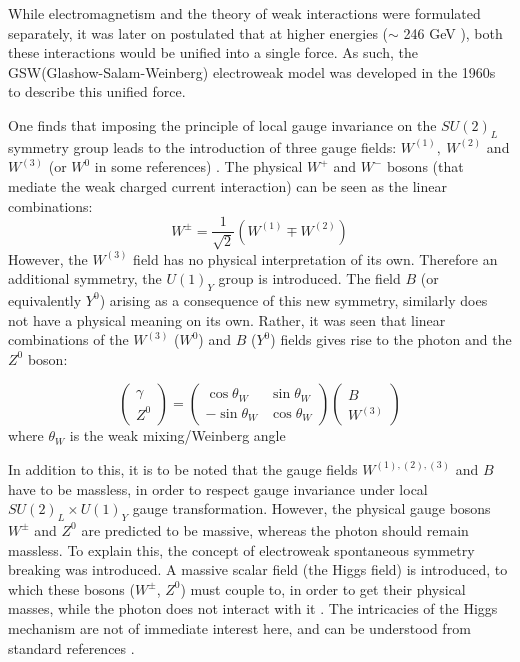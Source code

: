 While electromagnetism and the theory of weak interactions were formulated separately, it was later on postulated that at higher energies ($\sim$ 246 GeV \cite{enwiki:1085396801}), both these interactions would be unified into a single force. As such, the GSW(Glashow-Salam-Weinberg) electroweak model was developed in the 1960s to describe this unified force. 

One finds that imposing the principle of local gauge invariance on the $SU(2)_{L}$ symmetry group leads to the introduction of three gauge fields: $W^{(1)},\ W^{(2)}$ and $W^{(3)}$ (or $W^{0}$ in some references) \cite{thomson_2013}. The physical $W^{+}$ and $W^{-}$ bosons (that mediate the weak charged current interaction) can be seen as the linear combinations: 
\begin{equation}
W^{\pm}=\dfrac{1}{\sqrt{2}}\left(W^{(1)}\mp W^{(2)}\right)
\end{equation}
However, the $W^{(3)}$ field has no physical interpretation of its own. Therefore an additional symmetry, the $U(1)_{Y}$ group is introduced. The field $B$ (or equivalently $Y^{0}$) arising as a consequence of this new symmetry, similarly does not have a physical meaning on its own. Rather, it was seen that linear combinations of the $W^{(3)}$ ($W^{0}$) and $B$ ($Y^{0}$) fields gives rise to the  photon and the $Z^{0}$ boson:

\begin{equation}
\begin{pmatrix} 
\gamma \\ 
Z^{0} 
\end{pmatrix}
= 
\begin{pmatrix}
\cos \theta_{W} & \sin \theta_{W} \\
-\sin \theta_{W} & \cos \theta_{W} 
\end{pmatrix}
\begin{pmatrix}
B \\
W^{(3)}
\end{pmatrix}
\end{equation}
where $\theta_{W}$ is the weak mixing/Weinberg angle

In addition to this, it is to be noted that the gauge fields $W^{(1),(2),(3)}$ and $B$ have to be massless, in order to respect gauge invariance under local $SU(2)_{L}\times U(1)_{Y}$ gauge transformation. However, the physical gauge bosons $W^{\pm}$ and $Z^{0}$ are predicted to be massive, whereas the photon should remain massless. To explain this, the concept of electroweak spontaneous symmetry breaking was introduced. A massive scalar field (the Higgs field) is introduced, to which these bosons ($W^{\pm}$, $Z^{0}$) must couple to, in order to get their physical masses, while the photon does not interact with it \cite{Dooling:207610}. The intricacies of the Higgs mechanism are not of immediate interest here, and can be understood from standard references \cite{thomson_2013, Griffiths:111880}.
